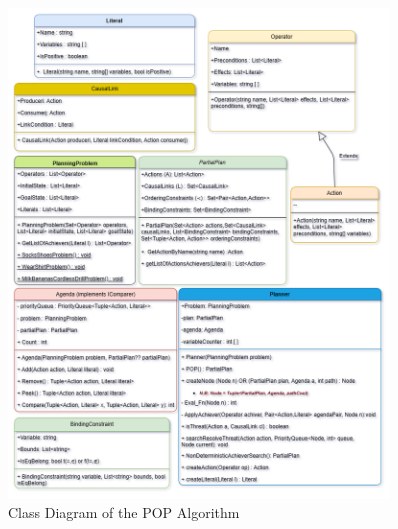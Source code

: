 \begin{figure}[ht]
    \centering
    \includegraphics[width=0.9\textwidth]{images/POP.png}
    \caption[Class Diagram of the POP Algorithm]{Class Diagram of the POP Algorithm}
    \label{fig:pop}
\end{figure}
